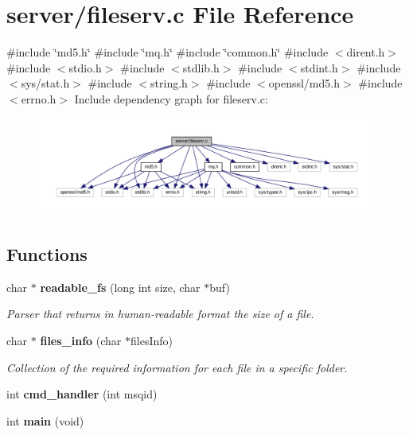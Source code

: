 \section{server/fileserv.c File Reference}
\label{fileserv_8c}
{\ttfamily \#include \char`\"{}md5.\+h\char`\"{}}\newline
{\ttfamily \#include \char`\"{}mq.\+h\char`\"{}}\newline
{\ttfamily \#include \char`\"{}common.\+h\char`\"{}}\newline
{\ttfamily \#include $<$dirent.\+h$>$}\newline
{\ttfamily \#include $<$stdio.\+h$>$}\newline
{\ttfamily \#include $<$stdlib.\+h$>$}\newline
{\ttfamily \#include $<$stdint.\+h$>$}\newline
{\ttfamily \#include $<$sys/stat.\+h$>$}\newline
{\ttfamily \#include $<$string.\+h$>$}\newline
{\ttfamily \#include $<$openssl/md5.\+h$>$}\newline
{\ttfamily \#include $<$errno.\+h$>$}\newline
Include dependency graph for fileserv.\+c\+:\nopagebreak
\begin{figure}[H]
\begin{center}
\leavevmode
\includegraphics[width=350pt]{fileserv_8c__incl}
\end{center}
\end{figure}
\subsection*{Functions}
\begin{DoxyCompactItemize}
\item 
char $\ast$ \textbf{ readable\+\_\+fs} (long int size, char $\ast$buf)
\begin{DoxyCompactList}\small\item\em Parser that returns in human-\/readable format the size of a file. \end{DoxyCompactList}\item 
char $\ast$ \textbf{ files\+\_\+info} (char $\ast$files\+Info)
\begin{DoxyCompactList}\small\item\em Collection of the required information for each file in a specific folder. \end{DoxyCompactList}\item 
int \textbf{ cmd\+\_\+handler} (int msqid)
\item 
int \textbf{ main} (void)
\end{DoxyCompactItemize}


